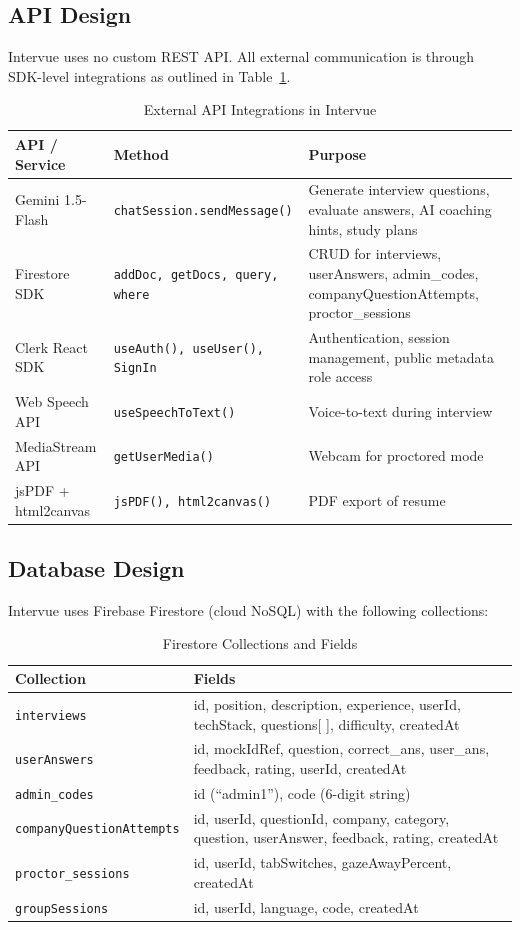 \documentclass{fisatprojectfinal}
\begin{document}
\subsection{API Design}
Intervue uses no custom REST API. All external communication is through SDK-level
integrations as outlined in Table~\ref{tab:api}.

\begin{table}[h!]
\centering
\caption{External API Integrations in Intervue}
\label{tab:api}
\begin{tabular}{|p{3.2cm}|p{3.2cm}|p{6cm}|}
\hline
\textbf{API / Service} & \textbf{Method} & \textbf{Purpose} \\
\hline
Gemini 1.5-Flash & \texttt{chatSession.sendMessage()} & Generate interview questions,
  evaluate answers, AI coaching hints, study plans \\
\hline
Firestore SDK & \texttt{addDoc, getDocs, query, where} & CRUD for interviews, userAnswers,
  admin\_codes, companyQuestionAttempts, proctor\_sessions \\
\hline
Clerk React SDK & \texttt{useAuth(), useUser(), SignIn} & Authentication, session
  management, public metadata role access \\
\hline
Web Speech API & \texttt{useSpeechToText()} & Voice-to-text during interview \\
\hline
MediaStream API & \texttt{getUserMedia()} & Webcam for proctored mode \\
\hline
jsPDF + html2canvas & \texttt{jsPDF(), html2canvas()} & PDF export of resume \\
\hline
\end{tabular}
\end{table}

\subsection{Database Design}
Intervue uses Firebase Firestore (cloud NoSQL) with the following collections:

\begin{table}[h!]
\centering
\caption{Firestore Collections and Fields}
\begin{tabular}{|p{3.8cm}|p{8.5cm}|}
\hline
\textbf{Collection} & \textbf{Fields} \\
\hline
\texttt{interviews} & id, position, description, experience, userId, techStack,
  questions[ ], difficulty, createdAt \\
\hline
\texttt{userAnswers} & id, mockIdRef, question, correct\_ans, user\_ans, feedback,
  rating, userId, createdAt \\
\hline
\texttt{admin\_codes} & id (``admin1''), code (6-digit string) \\
\hline
\texttt{companyQuestionAttempts} & id, userId, questionId, company, category, question,
  userAnswer, feedback, rating, createdAt \\
\hline
\texttt{proctor\_sessions} & id, userId, tabSwitches, gazeAwayPercent, createdAt \\
\hline
\texttt{groupSessions} & id, userId, language, code, createdAt \\
\hline
\end{tabular}
\end{table}
\end{document}
